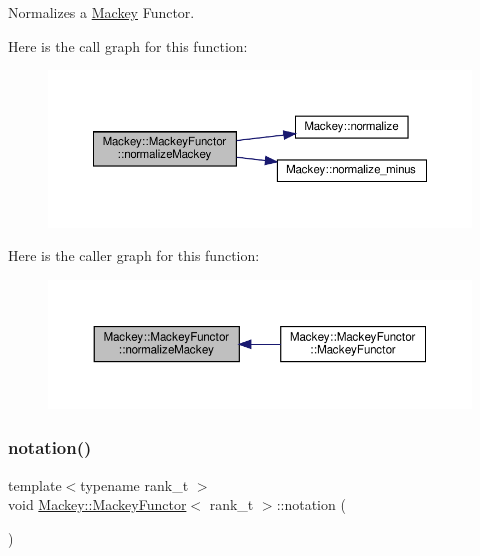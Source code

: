 Normalizes a \hyperlink{namespaceMackey}{Mackey} Functor. 

Here is the call graph for this function\+:\nopagebreak
\begin{figure}[H]
\begin{center}
\leavevmode
\includegraphics[width=350pt]{classMackey_1_1MackeyFunctor_a08150b3655fc27a7298d68b1857d830f_cgraph}
\end{center}
\end{figure}
Here is the caller graph for this function\+:\nopagebreak
\begin{figure}[H]
\begin{center}
\leavevmode
\includegraphics[width=350pt]{classMackey_1_1MackeyFunctor_a08150b3655fc27a7298d68b1857d830f_icgraph}
\end{center}
\end{figure}
\mbox{\label{classMackey_1_1MackeyFunctor_a2b333a786e44000c96ffd087a81a1d17}} 
\subsubsection{\texorpdfstring{notation()}{notation()}}
{\footnotesize\ttfamily template$<$typename rank\+\_\+t $>$ \\
void \hyperlink{classMackey_1_1MackeyFunctor}{Mackey\+::\+Mackey\+Functor}$<$ rank\+\_\+t $>$\+::notation (\begin{DoxyParamCaption}{ }\end{DoxyParamCaption})}



